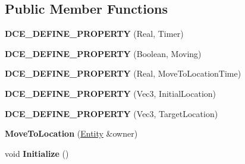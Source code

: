 \subsection*{Public Member Functions}
\begin{DoxyCompactItemize}
\item 
\hypertarget{classDCEngine_1_1Components_1_1MoveToLocation_a393c565d09d802d3642fae246809517d}{{\bfseries D\-C\-E\-\_\-\-D\-E\-F\-I\-N\-E\-\_\-\-P\-R\-O\-P\-E\-R\-T\-Y} (Real, Timer)}\label{classDCEngine_1_1Components_1_1MoveToLocation_a393c565d09d802d3642fae246809517d}

\item 
\hypertarget{classDCEngine_1_1Components_1_1MoveToLocation_a4c69ef78571c6fdcea286aa81644593b}{{\bfseries D\-C\-E\-\_\-\-D\-E\-F\-I\-N\-E\-\_\-\-P\-R\-O\-P\-E\-R\-T\-Y} (Boolean, Moving)}\label{classDCEngine_1_1Components_1_1MoveToLocation_a4c69ef78571c6fdcea286aa81644593b}

\item 
\hypertarget{classDCEngine_1_1Components_1_1MoveToLocation_a8c01824b9f130c959376f6f9b6f7f1ae}{{\bfseries D\-C\-E\-\_\-\-D\-E\-F\-I\-N\-E\-\_\-\-P\-R\-O\-P\-E\-R\-T\-Y} (Real, Move\-To\-Location\-Time)}\label{classDCEngine_1_1Components_1_1MoveToLocation_a8c01824b9f130c959376f6f9b6f7f1ae}

\item 
\hypertarget{classDCEngine_1_1Components_1_1MoveToLocation_a5e6864cba870f416a167f1b5374a89ae}{{\bfseries D\-C\-E\-\_\-\-D\-E\-F\-I\-N\-E\-\_\-\-P\-R\-O\-P\-E\-R\-T\-Y} (Vec3, Initial\-Location)}\label{classDCEngine_1_1Components_1_1MoveToLocation_a5e6864cba870f416a167f1b5374a89ae}

\item 
\hypertarget{classDCEngine_1_1Components_1_1MoveToLocation_a2cc47eb3c81d595fe6ba75b3384d45ed}{{\bfseries D\-C\-E\-\_\-\-D\-E\-F\-I\-N\-E\-\_\-\-P\-R\-O\-P\-E\-R\-T\-Y} (Vec3, Target\-Location)}\label{classDCEngine_1_1Components_1_1MoveToLocation_a2cc47eb3c81d595fe6ba75b3384d45ed}

\item 
\hypertarget{classDCEngine_1_1Components_1_1MoveToLocation_a2e75f41fa7166d580a5f7d6eb895e58d}{{\bfseries Move\-To\-Location} (\hyperlink{classDCEngine_1_1Entity}{Entity} \&owner)}\label{classDCEngine_1_1Components_1_1MoveToLocation_a2e75f41fa7166d580a5f7d6eb895e58d}

\item 
\hypertarget{classDCEngine_1_1Components_1_1MoveToLocation_a5ac1223de17dce886481592e4af88b36}{void {\bfseries Initialize} ()}\label{classDCEngine_1_1Components_1_1MoveToLocation_a5ac1223de17dce886481592e4af88b36}


\end{DoxyCompactItemize}
